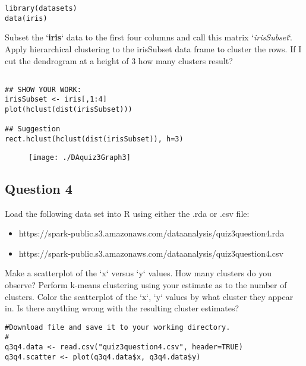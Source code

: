 \documentclass[12pt]{article}
\begin{document}
\begin{framed}
\begin{verbatim}
library(datasets)
data(iris)
\end{verbatim}
\end{framed}

Subset the `\textbf{iris}` data to the first four columns and call this matrix
`\textit{irisSubset}`. Apply hierarchical clustering to the irisSubset data frame to
cluster the rows. If I cut the dendrogram at a height of 3 how many clusters
result?

\begin{framed}
\begin{verbatim}

## SHOW YOUR WORK:
irisSubset <- iris[,1:4]
plot(hclust(dist(irisSubset)))

## Suggestion
rect.hclust(hclust(dist(irisSubset)), h=3)
\end{verbatim}
\end{framed}
\begin{figure}[h!]
\centering
\texttt{[image: ./DAquiz3Graph3]}
\caption{}
\label{fig:DAquiz3Graph2}
\end{figure}


\newpage
\subsection*{Question 4}

Load the following data set into R using either the .rda or .csv file: 

\begin{itemize}
\item https://spark-public.s3.amazonaws.com/dataanalysis/quiz3question4.rda 
\item  https://spark-public.s3.amazonaws.com/dataanalysis/quiz3question4.csv 
\end{itemize}
Make a scatterplot of the `x` versus `y` values. How many clusters do you
observe? Perform k-means clustering using your estimate as to the number of
clusters. Color the scatterplot of the `x`, `y` values by what cluster they
appear in. Is there anything wrong with the resulting cluster estimates?

\begin{framed}
\begin{verbatim}
#Download file and save it to your working directory.
#
q3q4.data <- read.csv("quiz3question4.csv", header=TRUE)
q3q4.scatter <- plot(q3q4.data$x, q3q4.data$y)
\end{verbatim}
\end{framed}
\end{document}
